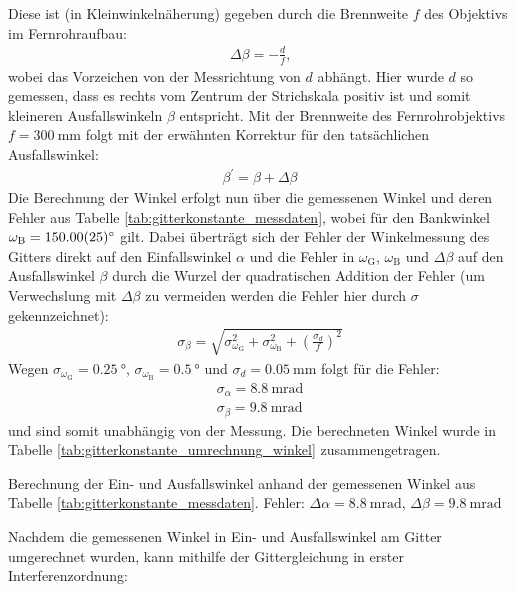 \documentclass[11pt, a4paper]{article}
\numberwithin{equation}{section}
\begin{document}
Diese ist (in Kleinwinkelnäherung) gegeben durch die Brennweite $f$ des Objektivs im Fernrohraufbau:
\begin{align*}
\Delta \beta = -\frac{d}{f} \text{,}
\end{align*}
wobei das Vorzeichen von der Messrichtung von $d$ abhängt.
Hier wurde $d$ so gemessen, dass es rechts vom Zentrum der Strichskala positiv ist und somit kleineren Ausfallswinkeln $\beta$ entspricht.
Mit der Brennweite des Fernrohrobjektivs $f = \SI{300}{\milli\metre}$ folgt mit der erwähnten Korrektur für den tatsächlichen Ausfallswinkel:
\begin{align*}
	\beta^\prime = \beta + \Delta \beta
\end{align*}
Die Berechnung der Winkel erfolgt nun über die gemessenen Winkel und deren Fehler aus Tabelle \ref{tab:gitterkonstante_messdaten}, wobei für den Bankwinkel $\omega_\mathrm{B} = \SI{150 +- 0.25}{\degree}$ gilt.
Dabei überträgt sich der Fehler der Winkelmessung des Gitters direkt auf den Einfallswinkel $\alpha$ und die Fehler in $\omega_\mathrm{G}$, $\omega_\mathrm{B}$ und $\Delta \beta$ auf den Ausfallswinkel $\beta$ durch die Wurzel der quadratischen Addition der Fehler (um Verwechslung mit $\Delta \beta$ zu vermeiden werden die Fehler hier durch $\sigma$ gekennzeichnet):
\begin{align*}
	\sigma_\beta = \sqrt{\sigma_{\omega_\mathrm{G}}^2 + \sigma_{\omega_\mathrm{B}}^2 + \left(\frac{\sigma_d}{f}\right)^2}
\end{align*}
Wegen $\sigma_{\omega_\mathrm{G}} = \SI{0.25}{\degree}$, $\sigma_{\omega_\mathrm{B}} = \SI{0.5}{\degree}$ und $\sigma_d = \SI{0.05}{\milli\metre}$ folgt für die Fehler:
\begin{align*}
	\sigma_\alpha = \SI{8.8}{\milli\radian}\\
	\sigma_\beta = \SI{9.8}{\milli\radian}
\end{align*}
und sind somit unabhängig von der Messung.
Die berechneten Winkel wurde in Tabelle \ref{tab:gitterkonstante_umrechnung_winkel} zusammengetragen.
\begin{table}[h]
	\centering
	
	\caption{Berechnung der Ein- und Ausfallswinkel anhand der gemessenen Winkel aus Tabelle \ref{tab:gitterkonstante_messdaten}. Fehler: $\Delta \alpha = \SI{8.8}{\milli\radian}$, $\Delta \beta = \SI{9.8}{\milli\radian}$}
	\label{tab:gitterkonstante_umrechnung_winkel}
\end{table}
Nachdem die gemessenen Winkel in Ein- und Ausfallswinkel am Gitter umgerechnet wurden, kann mithilfe der Gittergleichung in erster Interferenzordnung:
\end{document}
